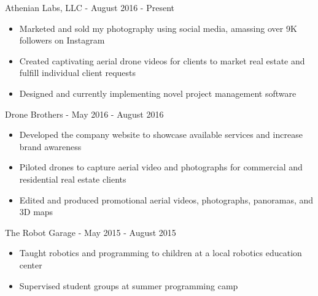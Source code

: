 \documentclass[]{template}
\begin{document}
\begin{entrylist}

\entry
{Athenian Labs, LLC  - }
{August 2016 - Present}
{
\vspace{-10.5pt}
\begin{itemize}[leftmargin=10pt, itemsep=-9pt, topsep=2pt]
    \item Marketed and sold my photography using social media, amassing over 9K followers on Instagram\\
    \item Created captivating aerial drone videos for clients to market real estate and fulfill individual client requests\\
    \item Designed and currently implementing novel project management software
\end{itemize}
}


\entry
{Drone Brothers  - }
{May 2016 - August 2016}
{
\vspace{-10.5pt}
\begin{itemize}[leftmargin=10pt, itemsep=-9pt, topsep=2pt]
    \item Developed the company website to showcase available services and increase brand awareness\\
    \item Piloted drones to capture aerial video and photographs for commercial and residential real estate clients\\
    \item Edited and produced promotional aerial videos, photographs, panoramas, and 3D maps
\end{itemize}
}


\entry
{The Robot Garage  - }
{May 2015 - August 2015}
{
\vspace{-10.5pt}
\begin{itemize}[leftmargin=10pt, itemsep=-9pt, topsep=2pt]
    \item Taught robotics and programming to children at a local robotics education center\\
    \item Supervised student groups at summer programming camp
\end{itemize}
}


\end{entrylist}
\end{document}

